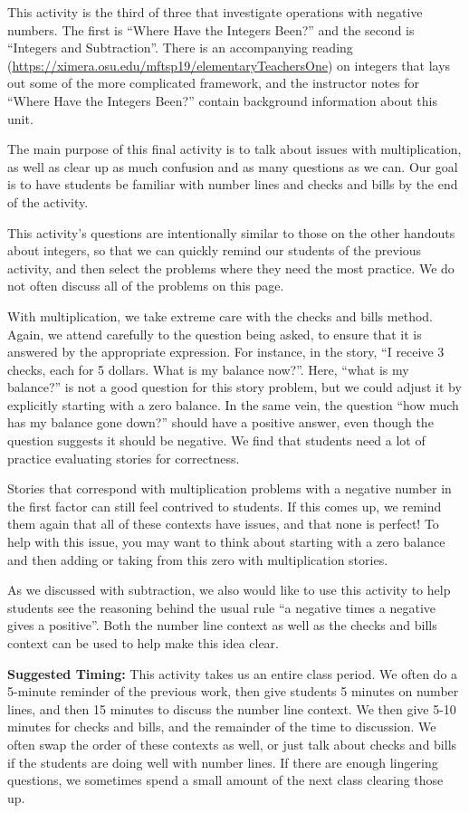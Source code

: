 \documentclass{ximera}
\begin{document}
\newpage
\begin{instructorNotes}
This activity is the third of three that investigate operations with negative numbers.  The first is ``Where Have the Integers Been?'' and the second is ``Integers and Subtraction''.  There is an accompanying reading (\url{https://ximera.osu.edu/mftsp19/elementaryTeachersOne}) on integers that lays out some of the more complicated framework, and the instructor notes for ``Where Have the Integers Been?'' contain background information about this unit.

The main purpose of this final activity is to talk about issues with multiplication, as well as clear up as much confusion and as many questions as we can.  Our goal is to have students be familiar with number lines and checks and bills by the end of the activity.

This activity's questions are intentionally similar to those on the other handouts about integers, so that we can quickly remind our students of the previous activity, and then select the problems where they need the most practice.  We do not often discuss all of the problems on this page.

With multiplication, we take extreme care with the checks and bills method.  Again, we attend carefully to the question being asked, to ensure that it is answered by the appropriate expression.  For instance, in the story, ``I receive 3 checks, each for 5 dollars.  What is my balance now?''.  Here, ``what is my balance?'' is not a good question for this story problem, but we could adjust it by explicitly starting with a zero balance.  In the same vein, the question ``how much has my balance gone down?'' should have a positive answer, even though the question suggests it should be negative.  We find that students need a lot of practice evaluating stories for correctness.

Stories that correspond with multiplication problems with a negative number in the first factor can still feel contrived to students.  If this comes up, we remind them again that all of these contexts have issues, and that none is perfect!  To help with this issue, you may want to think about starting with a zero balance and then adding or taking from this zero with multiplication stories.  

As we discussed with subtraction, we also would like to use this activity to help students see the reasoning behind the usual rule ``a negative times a negative gives a positive''.  Both the number line context as well as the checks and bills context can be used to help make this idea clear.

{\bf Suggested Timing:} This activity takes us an entire class period.  We often do a 5-minute reminder of the previous work, then give students 5 minutes on number lines, and then 15 minutes to discuss the number line context.  We then give 5-10 minutes for checks and bills, and the remainder of the time to discussion.  We often swap the order of these contexts as well, or just talk about checks and bills if the students are doing well with number lines.  If there are enough lingering questions, we sometimes spend a small amount of the next class clearing those up.
\end{instructorNotes}
\end{document}
